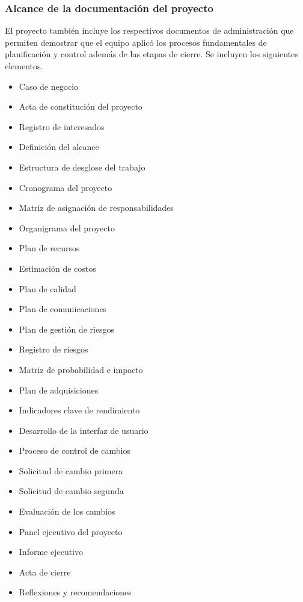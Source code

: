 \documentclass[11pt,spanish]{article}
\begin{document}
\subsubsection{Alcance de la documentación del proyecto}

El proyecto también incluye los respectivos documentos de administración que permiten demostrar que el equipo aplicó los procesos fundamentales de planificación y control además de las etapas de cierre. Se incluyen los siguientes elementos.

\begin{itemize}
    \item Caso de negocio
    \item Acta de constitución del proyecto
    \item Registro de interesados
    \item Definición del alcance
    \item Estructura de desglose del trabajo
    \item Cronograma del proyecto
    \item Matriz de asignación de responsabilidades
    \item Organigrama del proyecto
    \item Plan de recursos
    \item Estimación de costos
    \item Plan de calidad
    \item Plan de comunicaciones
    \item Plan de gestión de riesgos
    \item Registro de riesgos
    \item Matriz de probabilidad e impacto
    \item Plan de adquisiciones
    \item Indicadores clave de rendimiento
    \item Desarrollo de la interfaz de usuario
    \item Proceso de control de cambios
    \item Solicitud de cambio primera
    \item Solicitud de cambio segunda
    \item Evaluación de los cambios
    \item Panel ejecutivo del proyecto
    \item Informe ejecutivo
    \item Acta de cierre
    \item Reflexiones y recomendaciones
\end{itemize}
\end{document}
